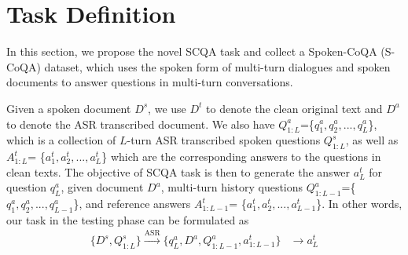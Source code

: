 \documentclass[11pt]{article}
\begin{document}
\begin{table}[t]
\centering

\caption{Comparison of Spoken-CoQA with existing spoken question answering datasets. S-SQuAD and S-CoQA denote Spoken-SQuAD and Spoken-CoQA, respectively.}
\label{table:sqa-vs-scqa}
\vspace{-10pt}
\end{table}


 

\section{Task Definition}


In this section, we propose the novel SCQA task and collect a Spoken-CoQA (S-CoQA) dataset, which uses the spoken form of multi-turn dialogues and spoken documents to answer questions in multi-turn conversations.

Given a spoken document $D^s$, we use $D^t$ to denote the clean original text and $D^a$ to denote the ASR transcribed document. We also have $Q^a_{1:L}$=\{$q^{a}_{1},q^{a}_{2},...,q^{a}_{L}$\}, which is a collection of $L$-turn ASR transcribed spoken questions $Q^s_{1:L}$, as well as $A^{t}_{1:L}$= \{$a^{t}_{1},a^{t}_{2},...,a^{t}_{L}$\} which are the corresponding answers to the questions in clean texts. The objective of SCQA task is then to generate the answer $a^t_L$ for question $q^a_L$, given document $D^a$, multi-turn history questions $Q^a_{1:L-1}$=\{$q^{a}_{1},q^{a}_{2},...,q^{a}_{L-1}$\}, and reference answers $A^t_{1:L-1}$= \{$a^{t}_{1},a^{t}_{2},...,a^{t}_{L-1}$\}. In other words, our task in the testing phase can be formulated as
\begin{equation}
\begin{aligned}
\{D^s,Q^s_{1:L}\}\xrightarrow{\text{ASR}}\{q^a_L,D^a,Q^a_{1:L-1},a^t_{1:L-1}\} &\to a^t_L
\label{eqn:task_def}
\end{aligned}
\end{equation}
\end{document}
